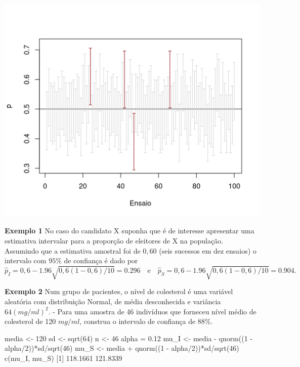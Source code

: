 \documentclass[
  10pt,
  a4paper]{book}
\newenvironment{Shaded}{\begin{snugshade}}{\end{snugshade}}
\newcommand{\DecValTok}[1]{\textcolor[rgb]{0.00,0.00,0.81}{#1}}
\newcommand{\FloatTok}[1]{\textcolor[rgb]{0.00,0.00,0.81}{#1}}
\newcommand{\FunctionTok}[1]{\textcolor[rgb]{0.00,0.00,0.00}{#1}}
\newcommand{\NormalTok}[1]{#1}
\newcommand{\OtherTok}[1]{\textcolor[rgb]{0.56,0.35,0.01}{#1}}
\newcommand{\SpecialCharTok}[1]{\textcolor[rgb]{0.00,0.00,0.00}{#1}}
\begin{document}
\begin{center}\includegraphics{figures/unnamed-chunk-386-1} \end{center}

\textbf{Exemplo 1} No caso do candidato X suponha que é de interesse apresentar uma estimativa intervalar para a proporção de eleitores de X na população. Assumindo que a estimativa amostral foi de \(0,60\) (seis sucessos em dez ensaios) o intervalo com \(95\%\) de confiança é dado por
\[
\hat{p}_I = 0,6 - 1.96\sqrt{0,6(1-0,6)/10} = 0.296 \quad \text{e} \quad \hat{p}_S = 0,6 - 1.96\sqrt{0,6(1-0,6)/10} = 0.904.
\]

\textbf{Exemplo 2} Num grupo de pacientes, o nível de colesterol é uma variável aleatória com distribuição Normal, de média desconhecida e variância \(64 (mg/ml)^2\).
- Para uma amostra de 46 indivíduos que forneceu nível médio de colesterol de 120 \(mg/ml\), construa o intervalo de confiança de \(88\%\).

\begin{Shaded}
\begin{Highlighting}[]
\NormalTok{media }\OtherTok{\textless{}{-}} \DecValTok{120}
\NormalTok{sd }\OtherTok{\textless{}{-}} \FunctionTok{sqrt}\NormalTok{(}\DecValTok{64}\NormalTok{)}
\NormalTok{n }\OtherTok{\textless{}{-}} \DecValTok{46}
\NormalTok{alpha }\OtherTok{=} \FloatTok{0.12}
\NormalTok{mu\_I }\OtherTok{\textless{}{-}}\NormalTok{ media }\SpecialCharTok{{-}} \FunctionTok{qnorm}\NormalTok{((}\DecValTok{1} \SpecialCharTok{{-}}\NormalTok{ alpha}\SpecialCharTok{/}\DecValTok{2}\NormalTok{))}\SpecialCharTok{*}\NormalTok{sd}\SpecialCharTok{/}\FunctionTok{sqrt}\NormalTok{(}\DecValTok{46}\NormalTok{)}
\NormalTok{mu\_S }\OtherTok{\textless{}{-}}\NormalTok{ media }\SpecialCharTok{+} \FunctionTok{qnorm}\NormalTok{((}\DecValTok{1} \SpecialCharTok{{-}}\NormalTok{ alpha}\SpecialCharTok{/}\DecValTok{2}\NormalTok{))}\SpecialCharTok{*}\NormalTok{sd}\SpecialCharTok{/}\FunctionTok{sqrt}\NormalTok{(}\DecValTok{46}\NormalTok{)}
\FunctionTok{c}\NormalTok{(mu\_I, mu\_S)}
\NormalTok{[}\DecValTok{1}\NormalTok{] }\FloatTok{118.1661} \FloatTok{121.8339}
\end{Highlighting}
\end{Shaded}
\end{document}
